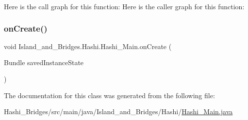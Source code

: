 Here is the call graph for this function\+:
Here is the caller graph for this function\+:
\mbox{\label{class_island__and___bridges_1_1_hashi_1_1_hashi___main_a00db9debcf1138ea9080e3762a5e7ac1}} 
\subsubsection{\texorpdfstring{on\+Create()}{onCreate()}}
{\footnotesize\ttfamily void Island\+\_\+and\+\_\+\+Bridges.\+Hashi.\+Hashi\+\_\+\+Main.\+on\+Create (\begin{DoxyParamCaption}\item[{Bundle}]{saved\+Instance\+State }\end{DoxyParamCaption})}



The documentation for this class was generated from the following file\+:\begin{DoxyCompactItemize}
\item 
Hashi\+\_\+\+Bridges/src/main/java/\+Island\+\_\+and\+\_\+\+Bridges/\+Hashi/\mbox{\hyperlink{_hashi___main_8java}{Hashi\+\_\+\+Main.\+java}}\end{DoxyCompactItemize}
